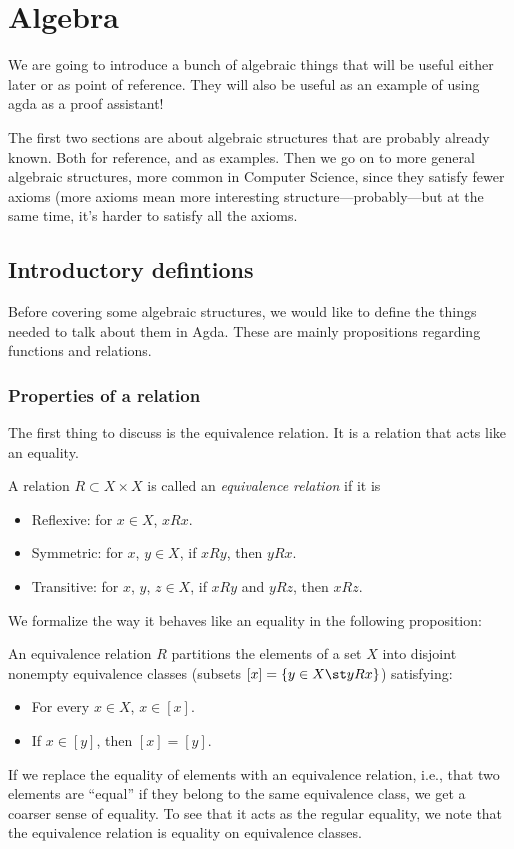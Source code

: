 \newcommand{\nanring}{nonassociative semiring}
\newcommand{\Nanring}{Nonassociative semiring}
\section{Algebra}
We are going to introduce a bunch of algebraic things that will be useful either later or as point of reference. They will also be useful as an example of using agda as a proof assistant!

The first two sections are about algebraic structures that are probably already known. Both for reference, and as examples. Then we go on to more general algebraic structures, more common in Computer Science, since they satisfy fewer axioms (more axioms mean more interesting structure---probably---but at the same time, it's harder to satisfy all the axioms.
\subsection{Introductory defintions}
Before covering some algebraic structures, we would like to define the things needed to talk about them in Agda. These are mainly propositions regarding functions and relations.
\subsubsection{Properties of a relation}
The first thing to discuss is the equivalence relation. It is a relation that acts like an equality.
\begin{Definition}
  A relation $R \subset X \times X$ is called an \emph{equivalence relation} if it is
  \begin{itemize}
  \item Reflexive: for $x \in X$, $x R x$.
  \item Symmetric: for $x$, $y \in X$, if $x R y$, then $y R x$.
  \item Transitive: for $x$, $y$, $z \in X$, if $x R y$ and $y R z$, then $x R z$.
  \end{itemize}
\end{Definition}
We formalize the way it behaves like an equality in the following proposition:
\begin{Proposition}
An equivalence relation $R$ partitions the elements of a set $X$ into disjoint nonempty equivalence classes (subsets $[x] = \{y \in X \st y R x\}$) satisfying: 
\begin{itemize}
\item For every $x \in X$, $x \in [x]$.
\item If $x \in [y]$, then $[x] = [y]$.
\end{itemize}
\end{Proposition}
If we replace the equality of elements with an equivalence relation, i.e., that two elements are ``equal'' if they belong to the same equivalence class, we get a coarser sense of equality. To see that it acts as the regular equality, we note that the equivalence relation is equality on equivalence classes.

